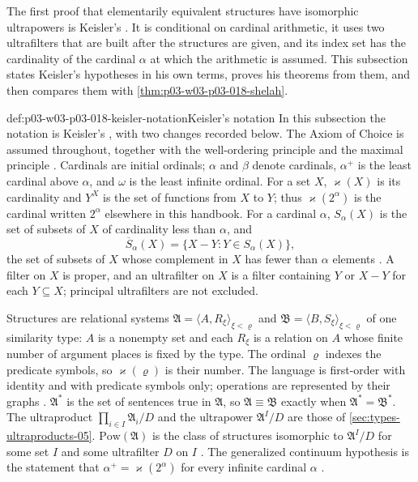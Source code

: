 The first proof that elementarily equivalent structures have isomorphic
ultrapowers is Keisler's \cite{Keisler1961ElementaryClasses}.  It is
conditional on cardinal arithmetic, it uses two ultrafilters that are built
after the structures are given, and its index set has the cardinality of the
cardinal \(\alpha\) at which the arithmetic is assumed.  This subsection states
Keisler's hypotheses in his own terms, proves his theorems from them, and
then compares them with \cref{thm:p03-w03-p03-018-shelah}.

\begin{hbconvention}{def:p03-w03-p03-018-keisler-notation}{Keisler's notation}
In this subsection the notation is Keisler's
\cite[479--483]{Keisler1961ElementaryClasses}, with two changes recorded
below.  The Axiom of Choice is assumed throughout, together with the
well-ordering principle and the maximal principle
\cite[479]{Keisler1961ElementaryClasses}.  Cardinals are initial ordinals;
\(\alpha\) and \(\beta\) denote cardinals, \(\alpha^+\) is the least cardinal
above \(\alpha\), and \(\omega\) is the least infinite ordinal.  For a set
\(X\), \(\varkappa(X)\) is its cardinality and \(Y^X\) is the set of functions
from \(X\) to \(Y\); thus \(\varkappa(2^\alpha)\) is the cardinal written
\(2^\alpha\) elsewhere in this handbook.  For a cardinal \(\alpha\),
\(S_\alpha(X)\) is the set of subsets of \(X\) of cardinality less than
\(\alpha\), and
\[
  \overline S_\alpha(X)=\{X-Y:Y\in S_\alpha(X)\},
\]
the set of subsets of \(X\) whose complement in \(X\) has fewer than \(\alpha\)
elements \cite[480]{Keisler1961ElementaryClasses}.  A filter on \(X\) is
proper, and an ultrafilter on \(X\) is a filter containing \(Y\) or \(X-Y\)
for each \(Y\subseteq X\); principal ultrafilters are not excluded.

Structures are relational systems
\(\mathfrak A=\langle A,R_\xi\rangle_{\xi<\varrho}\) and
\(\mathfrak B=\langle B,S_\xi\rangle_{\xi<\varrho}\) of one similarity type:
\(A\) is a nonempty set and each \(R_\xi\) is a relation on \(A\) whose finite
number of argument places is fixed by the type.  The ordinal \(\varrho\)
indexes the predicate symbols, so \(\varkappa(\varrho)\) is their number.  The
language is first-order with identity and with predicate symbols only;
operations are represented by their graphs
\cite[481]{Keisler1961ElementaryClasses}.  \(\mathfrak A^*\) is the set of
sentences true in \(\mathfrak A\), so \(\mathfrak A\equiv\mathfrak B\) exactly
when \(\mathfrak A^*=\mathfrak B^*\).  The ultraproduct
\(\prod_{i\in I}\mathfrak A_i/D\) and the ultrapower \(\mathfrak A^I/D\) are
those of \cref{sec:types-ultraproducts-05}.  \(\mathrm{Pow}(\mathfrak A)\) is
the class of structures isomorphic to \(\mathfrak A^I/D\) for some set \(I\)
and some ultrafilter \(D\) on \(I\) \cite[483]{Keisler1961ElementaryClasses}.
The generalized continuum hypothesis is the statement that
\(\alpha^+=\varkappa(2^\alpha)\) for every infinite cardinal \(\alpha\)
\cite[480]{Keisler1961ElementaryClasses}.


\end{hbconvention}
